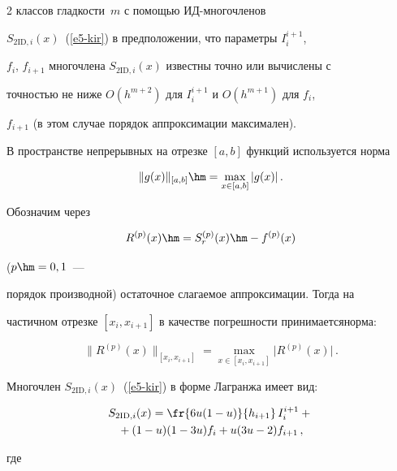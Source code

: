 \begin{multicols}{2}
классов глад\-кости~$m$ с помощью ИД-мно\-го\-чле\-нов 


$S_{2\mathrm{ID},i}(x)$~(\ref{e5-kir}) в предположении, что параметры $I_i^{i+1}$, 


$f_i$, $f_{i+1}$ многочлена $S_{2\mathrm{ID},i}(x)$ известны точно или вычислены с 


точ\-ностью не ниже $O(h^{m+2})$ для $I_i^{i+1}$ и $O(h^{m+1})$ для $f_i$, 


$f_{i+1}$ (в этом случае порядок аппроксимации максимален).


  


  В пространстве непрерывных на отрезке $[a,b]$ функций используется норма 


$$


\| g(x)\|_{[a,b]} \hm = \max\limits_{x\in [a,b]} \vert g(x)\vert\,.


$$ 





Обозначим через 


$$


R^{(p)}(x)\hm= S_r^{(p)}(x)\hm- f^{(p)}(x)


$$ 


($p\hm=0, 1$~--- 


порядок производной) остаточное слагаемое аппроксимации. Тогда на 


частичном отрезке $[x_i,x_{i+1}]$ в качестве погрешности принимается\linebreak норма:


  $$


  \parallel \!R^{(p)} (x)\!\parallel_{[x_i,x_{i+1}]} = \max\limits_{x\in [x_i,x_{i+1}]} 


\vert R^{(p)}(x)\vert\,.


  $$


  


  Многочлен $S_{2\mathrm{ID},i}(x)$~(\ref{e5-kir}) в форме Лагранжа имеет вид:


  \begin{multline*}


  S_{2\mathrm{ID},i}(x) =\fr{6u(1-u)}{h_{i+1}}\,I_i^{i+1}+{}\\


  {}+(1-u) (1-3u)    f_i+ u(3u-2)f_{i+1}\,,


\end{multline*}


где 



\end{multicols}
